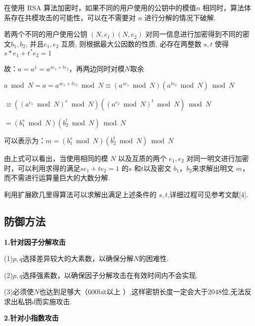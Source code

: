 \documentclass[a4paper,12pt]{article}
\newcommand{\upcite}[1]{\textsuperscript{\textsuperscript{\cite{#1}}}}
\begin{document}
在使用 RSA 算法加密时，如果不同的用户使用的公钥中的模值$ n$ 相同时，算法体系存在共模攻击的可能性，可以在不需要对 $n$ 进行分解的情况下破解\upcite{共模攻击}.\par 
若两个不同的用户使用公钥 $ \left(N, e_{1}\right)\left(N, e_{2}\right) $ 对同一信息进行加密得到不同的密文$  b_{1}, b_{2} $, 并且$  e_{1}, e_{2} $ 互质, 则根据最大公因数的性质, 必存在两整数 $s, t$  使得 $ s * e_{1}+t^{*} e_{2}=1$ \par
故：$a=a^{1}=a^{s e_{1}+t e_{2}}$，再两边同时对模$N$取余\par 
$a\bmod N=a=a^{se_1+te_2}\bmod N\equiv (a^{se_1}\bmod N)(a^{te_2}\bmod N)\bmod N$\par 
$\equiv ((a^{e_1}\bmod N)^s\bmod N)((a^{e_2}\bmod N)^t\bmod N)\bmod N$\par 
$=(b_1^s\bmod N)(b_2^t\bmod N)\bmod N$\par 
可以表示为：$m=(b_1^s\bmod N)(b_2^t\bmod N)\bmod N$\upcite{python破解} \par 
由上式可以看出，当使用相同的模 $N$ 以及互质的两个 $e_1,e_2$ 对同一明文进行加密时，可以利用求得的满足$se_1+te_2=1$ 的$ s$ 和$ t $以及密文 $b_1，b_2 $来求解出明文 $m$，而不需进行运算量巨大的大数分解.\par 
利用扩展欧几里得算法可以求解出满足上述条件的 $s,t$,详细过程可见参考文献[4].\par 




\subsection{防御方法}

\textbf{1.针对因子分解攻击}\par

(1)$p,q$选择差异较大的大素数，以确保分解$N$的困难性.\par 
(2)$p,q$选择强素数，以确保因子分解攻击在有效时间内不会实现.\upcite{黑客破解}\par 
(3)必须使$N$也达到足够大（600bit以上 ）,这样密钥长度一定会大于2048位,无法反求出私钥$d$而实施攻击.\upcite{黑客破解} \par 
\quad  \par 


\textbf{2.针对小指数攻击}\par
\end{document}
